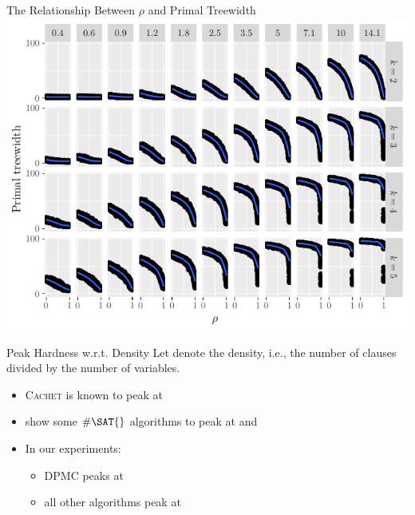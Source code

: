 \documentclass{beamer}
\begin{document}
\begin{frame}{The Relationship Between $\rho$ and Primal Treewidth}
  \includegraphics{regular_repetitiveness.pdf}
\end{frame}


\begin{frame}{Peak Hardness w.r.t. Density}
  Let \structure{$\mu$} denote the \alert{density}, i.e., the number of clauses
  divided by the number of variables.
  \begin{itemize}
    \item \textsc{Cachet} is known to peak at 
          \textcolor{gray}{\parencite{DBLP:conf/sat/SangBBKP04}}
    \item \textcolor{gray}{\textcite{DBLP:conf/aaai/Pehoushek00}} show some
          $\#\SAT{}$ algorithms to peak at  and
          \pause
    \item In our experiments:
    \begin{itemize}
      \item \textsc{DPMC} peaks at 
      \item all other algorithms peak at 
    \end{itemize}
  \end{itemize}
\end{frame}
\end{document}
